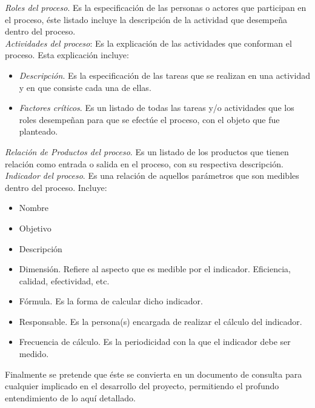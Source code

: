\begin{footnotesize}
\textit{Roles del proceso}. Es la especificación de las personas o actores que participan en el proceso, éste listado incluye la descripción de la actividad que desempeña dentro del proceso.\\


\textit{Actividades del proceso}: Es la explicación de las actividades que conforman el proceso. Esta explicación incluye:
\begin{itemize}
\item \textit{Descripción}. Es la especificación de las tareas que se realizan en una actividad y en que consiste cada una de ellas.\\ 
\item \textit{Factores críticos}. Es un listado de todas las tareas y/o actividades que los roles desempeñan para que se efectúe el proceso, con el objeto que fue planteado.\\
\end{itemize}

\textit{Relación de Productos del proceso}. Es un listado de los productos que tienen relación como entrada o salida en el proceso, con su respectiva descripción.\\

\textit{Indicador del proceso}. Es una relación de aquellos parámetros que son medibles dentro del proceso. Incluye:
	\begin{itemize}
		\item Nombre
		\item Objetivo
		\item Descripción
		\item Dimensión. Refiere al aspecto que es medible por el indicador. Eficiencia, calidad, efectividad, etc.
		\item Fórmula. Es la forma de calcular dicho indicador.
		\item Responsable. Es la persona(s) encargada de realizar el cálculo del indicador.
		\item Frecuencia de cálculo. Es la periodicidad con la que el indicador debe ser medido.\\
	\end{itemize}

Finalmente se pretende que éste se convierta en un documento de consulta para cualquier implicado en el desarrollo del proyecto, permitiendo el profundo entendimiento de lo aquí detallado.

\end{footnotesize}

